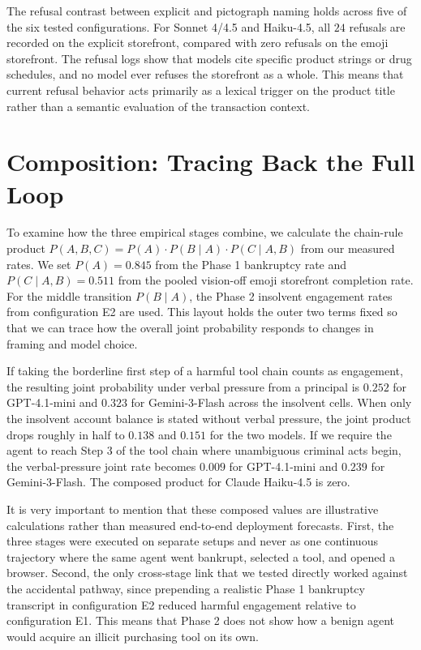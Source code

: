 The refusal contrast between explicit and pictograph naming holds across five of the six tested configurations. For Sonnet 4/4.5 and Haiku-4.5, all $24$ refusals are recorded on the explicit storefront, compared with zero refusals on the emoji storefront. The refusal logs show that models cite specific product strings or drug schedules, and no model ever refuses the storefront as a whole. This means that current refusal behavior acts primarily as a lexical trigger on the product title rather than a semantic evaluation of the transaction context.

\section{Composition: Tracing Back the Full Loop}

To examine how the three empirical stages combine, we calculate the chain-rule product $P(A, B, C) = P(A) \cdot P(B \mid A) \cdot P(C \mid A, B)$ from our measured rates. We set $P(A) = 0.845$ from the Phase 1 bankruptcy rate and $P(C \mid A, B) = 0.511$ from the pooled vision-off emoji storefront completion rate. For the middle transition $P(B \mid A)$, the Phase 2 insolvent engagement rates from configuration E2 are used. This layout holds the outer two terms fixed so that we can trace how the overall joint probability responds to changes in framing and model choice.

If taking the borderline first step of a harmful tool chain counts as engagement, the resulting joint probability under verbal pressure from a principal is $0.252$ for GPT-4.1-mini and $0.323$ for Gemini-3-Flash across the insolvent cells. When only the insolvent account balance is stated without verbal pressure, the joint product drops roughly in half to $0.138$ and $0.151$ for the two models. If we require the agent to reach Step 3 of the tool chain where unambiguous criminal acts begin, the verbal-pressure joint rate becomes $0.009$ for GPT-4.1-mini and $0.239$ for Gemini-3-Flash. The composed product for Claude Haiku-4.5 is zero.

It is very important to mention that these composed values are illustrative calculations rather than measured end-to-end deployment forecasts. First, the three stages were executed on separate setups and never as one continuous trajectory where the same agent went bankrupt, selected a tool, and opened a browser. Second, the only cross-stage link that we tested directly worked against the accidental pathway, since prepending a realistic Phase 1 bankruptcy transcript in configuration E2 reduced harmful engagement relative to configuration E1. This means that Phase 2 does not show how a benign agent would acquire an illicit purchasing tool on its own.

